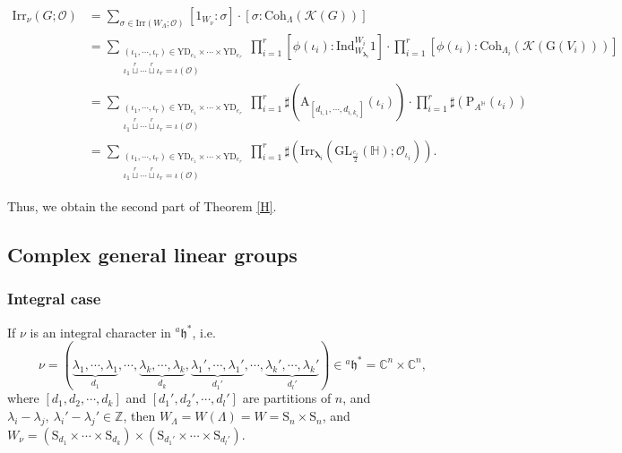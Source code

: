 \documentclass[12pt, a4paper]{amsart}
\numberwithin{equation}{section}
\newcommand{\blam}{{\boldsymbol{\lambda}}}
\newcommand{\BC}{{\mathbb {C}}}
\newcommand{\BH}{{\mathbb {H}}}
\newcommand{\BZ}{{\mathbb {Z}}}
\newcommand{\CK}{{\mathcal {K}}}
\newcommand{\CO}{{\mathcal {O}}}
\newcommand{\fh}{\mathfrak{h}}
\newcommand{\GL}{{\mathrm{GL}}}
\newcommand{\G}{{\mathrm{G}}}
\newcommand{\Ind}{{\mathrm{Ind}}}
\newcommand{\Irr}{{\mathrm{Irr}}}
\begin{document}
\begin{align}
    \Irr_{\nu}(G;\CO) & = \sum_{\sigma \in \Irr(W_\Lambda;\CO)}[1_{W_\nu}:\sigma]\cdot[\sigma:\mathrm{Coh}_{\Lambda}(\CK(G))]\\
    & = \sum_{\substack{(\iota_1,\cdots,\iota_r) \in \mathrm{YD}_{e_1} \times \cdots \times \mathrm{YD}_{e_r} \\ \iota_1 \mathop{\sqcup}\limits^r \cdots  \mathop{\sqcup}\limits^r \iota_r = \iota(\CO)}}\prod_{i=1}^r [\phi(\iota_i): \Ind_{W_{\blam_i}}^{W_i}1]\cdot \prod_{i=1}^r[\phi(\iota_i):\mathrm{Coh}_{\Lambda_i}(\CK(\G(V_i)))]\\
    & = \sum_{\substack{(\iota_1,\cdots,\iota_r) \in \mathrm{YD}_{e_1} \times \cdots \times \mathrm{YD}_{e_r} \\ \iota_1 \mathop{\sqcup}\limits^r \cdots  \mathop{\sqcup}\limits^r \iota_r = \iota(\CO)}} \prod_{i=1}^{r}\sharp(\mathrm{A}_{[d_{i,1}, \cdots,d_{i,k_i}]}(\iota_i)) \cdot \prod_{i=1}^r \sharp(\mathrm{P}_{A^\BH}(\iota_i))\\
    & = \sum_{\substack{(\iota_1,\cdots,\iota_r) \in \mathrm{YD}_{e_1} \times \cdots \times \mathrm{YD}_{e_r} \\ \iota_1 \mathop{\sqcup}\limits^r \cdots  \mathop{\sqcup}\limits^r \iota_r = \iota(\CO)}} \prod_{i=1}^r \sharp(\Irr_{\blam_i}(\GL_{\frac{e_i}{2}}(\BH);\CO_{\iota_i})).
\end{align}

Thus, we obtain the second part of Theorem \ref{H}.










\subsection{Complex general linear groups}

\subsubsection{Integral case}
If $\nu$ is an integral character in $^{a}\fh^*$, i.e. 
$$\nu =  (\underbrace{\lambda_1, \cdots, \lambda_1}_{d_1}, \cdots, \underbrace{\lambda_k, \cdots, \lambda_k}_{d_k}, \underbrace{\lambda_1', \cdots, \lambda_1'}_{d_1'}, \cdots, \underbrace{\lambda_k', \cdots, \lambda_k'}_{d_{l}'} ) \in {^{a}\fh^*} = \BC^n \times \BC^n,$$ 
where $[d_1,d_2,\cdots,d_k]$ and $[d_1',d_2',\cdots,d_l']$ are partitions of $n$, and $\lambda_i - \lambda_j, \ \lambda_i' - \lambda_j' \in \BZ$, then $W_{\Lambda} =W(\Lambda) = W = \mathrm{S}_n \times \mathrm{S}_n$, and $W_\nu = (\mathrm{S}_{d_1} \times \cdots \times \mathrm{S}_{d_k}) \times (\mathrm{S}_{d_1'} \times \cdots \times \mathrm{S}_{d_l'})$. 
\end{document}
